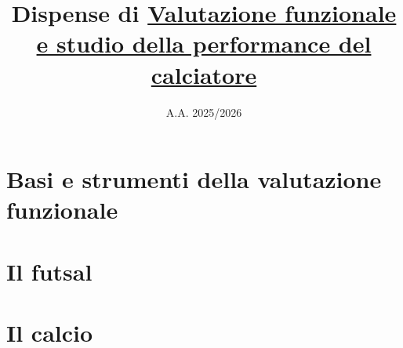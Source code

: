 \documentclass[11pt, oneside, openany]{book}
\title{Dispense di \underline{Valutazione funzionale}\\ \underline{e studio della performance del calciatore}}
\author{}
\date{A.A. 2025/2026}
\begin{document}
\frontmatter                 %

\maketitle
\thispagestyle{empty}
\clearpage

\tableofcontents
\clearpage

\mainmatter                  %


\part{Basi e strumenti della valutazione funzionale}










\part{Il futsal}









\part{Il calcio}






\end{document}
